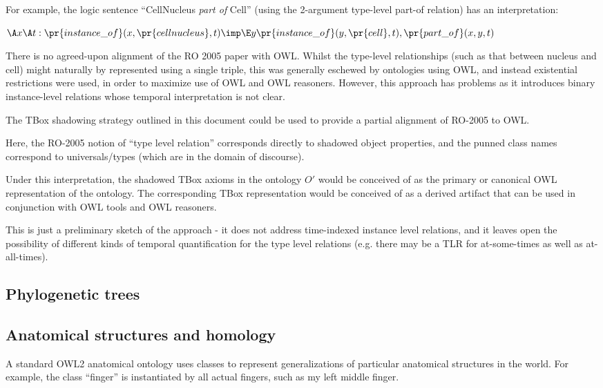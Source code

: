 \documentclass{my}
\def\partOf{\pr{part\_of}}
\def\instanceOf{\pr{instance\_of}}
\def\CellNucleus{\pr{cell nucleus}}
\def\Cell{\pr{cell}}
\begin{document}
For example, the logic sentence ``CellNucleus \emph{part of} Cell''
(using the 2-argument type-level part-of relation) has an interpretation:

$
\A x \A t : \instanceOf(x, \CellNucleus, t) \imp \\
 \E y \instanceOf(y, \Cell, t), \partOf(x,y,t)
$

There is no agreed-upon alignment of the RO 2005 paper with
OWL. Whilst the type-level relationships (such as that between nucleus
and cell) might naturally by represented using a single triple, this
was generally eschewed by ontologies using OWL, and instead
existential restrictions were used\cite{golbreich2007obo}, in order to
maximize use of OWL and OWL reasoners. However, this approach has
problems as it introduces binary instance-level relations whose
temporal interpretation is not clear.

The TBox shadowing strategy outlined in this document could be used to
provide a partial alignment of RO-2005 to OWL.

Here, the RO-2005 notion of ``type level relation'' corresponds
directly to shadowed object properties, and the punned class names
correspond to universals/types (which are in the domain of
discourse).

Under this interpretation, the shadowed TBox axioms in the ontology
$O'$ would be conceived of as the primary or canonical OWL
representation of the ontology. The corresponding TBox representation
would be conceived of as a derived artifact that can be used in
conjunction with OWL tools and OWL reasoners.

This is just a preliminary sketch of the approach - it does not
address time-indexed instance level relations, and it leaves open the
possibility of different kinds of temporal quantification for the type
level relations (e.g. there may be a TLR for at-some-times as well as
at-all-times).

\subsection{Phylogenetic trees}

\subsection{Anatomical structures and homology}

A standard OWL2 anatomical ontology uses classes to represent
generalizations of particular anatomical structures in the world. For
example, the class ``finger'' is instantiated by all actual fingers,
such as my left middle finger.
\end{document}
